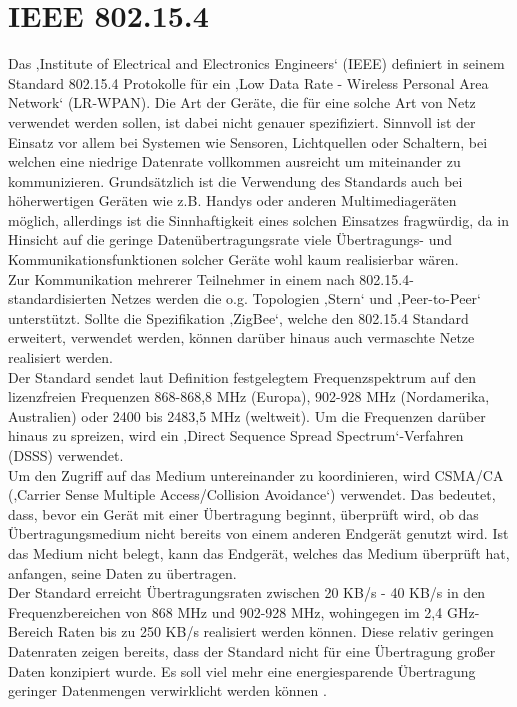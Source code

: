 \section{IEEE 802.15.4}\label{ss:IEEE802154}

Das ‚Institute of Electrical and Electronics Engineers‘ (IEEE) definiert in seinem Standard 802.15.4 Protokolle für ein ‚Low Data Rate - Wireless Personal Area Network‘ (LR-WPAN). Die Art der Geräte, die für eine solche Art von Netz verwendet werden sollen, ist dabei nicht genauer spezifiziert. Sinnvoll ist der Einsatz vor allem bei Systemen wie Sensoren, Lichtquellen oder Schaltern, bei welchen eine niedrige Datenrate vollkommen ausreicht um miteinander zu kommunizieren. Grundsätzlich ist die Verwendung des Standards auch bei höherwertigen Geräten wie z.B. Handys oder anderen Multimediageräten möglich, allerdings ist die Sinnhaftigkeit eines solchen Einsatzes fragwürdig, da in Hinsicht auf die geringe Datenübertragungsrate viele Übertragungs- und Kommunikationsfunktionen solcher Geräte wohl kaum realisierbar wären. \\
Zur Kommunikation mehrerer Teilnehmer in einem nach 802.15.4-standardisierten Netzes werden die o.g. Topologien ‚Stern‘ und ‚Peer-to-Peer‘ unterstützt. Sollte die Spezifikation ‚ZigBee‘,  welche den 802.15.4 Standard erweitert, verwendet werden, können darüber hinaus auch vermaschte Netze realisiert werden. \\
Der Standard sendet laut Definition festgelegtem Frequenzspektrum auf den lizenzfreien Frequenzen 868-868,8 MHz (Europa), 902-928 MHz (Nordamerika, Australien) oder 2400 bis 2483,5 MHz (weltweit). Um die Frequenzen darüber hinaus zu spreizen, wird ein ‚Direct Sequence Spread Spectrum‘-Verfahren (DSSS) verwendet.\\ 
Um den Zugriff auf das Medium untereinander zu koordinieren, wird CSMA/CA (‚Carrier Sense Multiple Access/Collision Avoidance‘) verwendet. Das bedeutet, dass, bevor ein Gerät mit einer Übertragung beginnt, überprüft wird, ob das Übertragungsmedium nicht bereits von einem anderen Endgerät genutzt wird. Ist das Medium nicht belegt, kann das Endgerät, welches das Medium überprüft hat, anfangen, seine Daten zu übertragen.\\
Der Standard erreicht Übertragungsraten zwischen 20 KB/s - 40 KB/s in den Frequenzbereichen von 868 MHz und 902-928 MHz, wohingegen im 2,4 GHz-Bereich Raten bis zu 250 KB/s realisiert werden können. Diese relativ geringen Datenraten zeigen bereits, dass der Standard nicht für eine Übertragung großer Daten konzipiert wurde. Es soll viel mehr eine energiesparende Übertragung geringer Datenmengen verwirklicht werden können \cite{d:hesse} \cite{d:ieee}.

